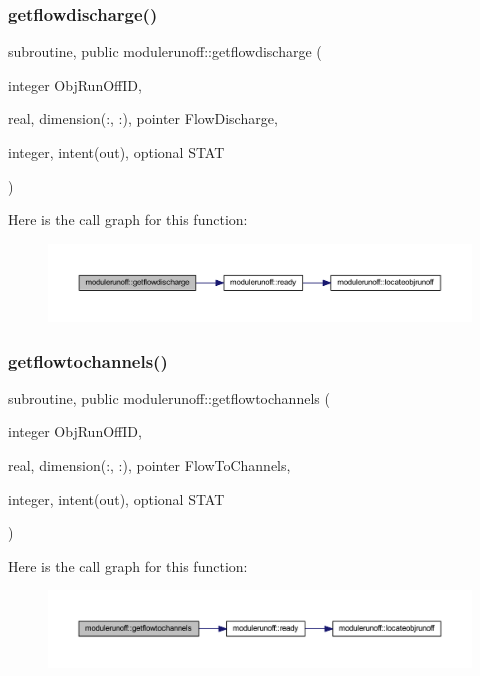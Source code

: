 \subsubsection{\texorpdfstring{getflowdischarge()}{getflowdischarge()}}
{\footnotesize\ttfamily subroutine, public modulerunoff\+::getflowdischarge (\begin{DoxyParamCaption}\item[{integer}]{Obj\+Run\+Off\+ID,  }\item[{real, dimension(\+:, \+:), pointer}]{Flow\+Discharge,  }\item[{integer, intent(out), optional}]{S\+T\+AT }\end{DoxyParamCaption})}

Here is the call graph for this function\+:\nopagebreak
\begin{figure}[H]
\begin{center}
\leavevmode
\includegraphics[width=350pt]{namespacemodulerunoff_a35dbdf0f3737830c01b78496fc043851_cgraph}
\end{center}
\end{figure}
\mbox{\label{namespacemodulerunoff_af164eb766650a303ad4fbe9de7bcb541}} 
\subsubsection{\texorpdfstring{getflowtochannels()}{getflowtochannels()}}
{\footnotesize\ttfamily subroutine, public modulerunoff\+::getflowtochannels (\begin{DoxyParamCaption}\item[{integer}]{Obj\+Run\+Off\+ID,  }\item[{real, dimension(\+:, \+:), pointer}]{Flow\+To\+Channels,  }\item[{integer, intent(out), optional}]{S\+T\+AT }\end{DoxyParamCaption})}

Here is the call graph for this function\+:\nopagebreak
\begin{figure}[H]
\begin{center}
\leavevmode
\includegraphics[width=350pt]{namespacemodulerunoff_af164eb766650a303ad4fbe9de7bcb541_cgraph}
\end{center}
\end{figure}
\mbox{\label{namespacemodulerunoff_a2cad42fe7c6c24a46f9a75f3528e8abb}} 

